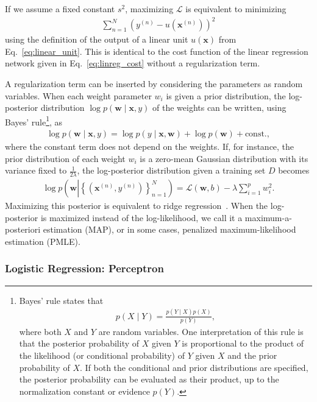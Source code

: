 \documentclass{now}
\newcommand{\vect}[1]{\mathbf{#1}}
\newcommand{\vx}[0]{\vect{x}}
\newcommand{\vw}[0]{\vect{w}}
\newcommand{\LL}[0]{\mathcal{L}}
\begin{document}
If we assume a fixed constant $s^2$, maximizing $\LL$ is equivalent to
minimizing
\begin{align*}
    \sum_{n=1}^N \left( y^{(n)} - u(\vx^{(n)})\right)^2
\end{align*}
using the definition of the output of a linear unit $u(\vx)$ from
Eq.~\eqref{eq:linear_unit}. This is identical to the cost function of the linear
regression network given in Eq.~\eqref{eq:linreg_cost} without a regularization
term. 

A regularization term can be inserted by considering the parameters as random
variables. When each weight parameter $w_i$ is given a prior distribution, the
log-posterior distribution $\log p(\vw \mid \vx, y)$ of the weights can be
written, using Bayes' rule\footnote{
    Bayes' rule states that
    \begin{align}
        \label{eq:bayes_rule}
        p(X \mid Y) = \frac{p(Y \mid X) p(X)}{p(Y)},
    \end{align}
    where both $X$ and $Y$ are random variables. One
    interpretation of this rule is that the posterior
    probability of $X$ given $Y$ is proportional to the product
    of the likelihood (or conditional probability) of $Y$ given
    $X$ and the prior probability of $X$. 
    If both the
    conditional and prior distributions are specified, the
    posterior probability can be evaluated as their product, up
    to the normalization constant or evidence $p(Y)$.
}, as
\begin{align*}
    \log p(\vw \mid \vx, y) = \log p(y \mid \vx, \vw) + \log
    p(\vw) + \text{const.},
\end{align*}
where the constant term does not depend on the weights. If, for instance, the
prior distribution of each weight $w_i$ is a zero-mean Gaussian distribution
with its variance fixed to $\tfrac{1}{2\lambda}$, the log-posterior distribution
given a training set $D$ becomes
\begin{align*}
    \log p\left(\vw \left| \left\{ (\vx^{(n)}, y^{(n)})
    \right\}_{n=1}^N \right. \right) = \LL(\vw, b) - \lambda
    \sum_{i=1}^p w_i^2.
\end{align*}
Maximizing this posterior is equivalent to ridge regression~\citep{Hoerl1970}.
When the log-posterior is maximized instead of the log-likelihood, we call it a
maximum-a-posteriori estimation (MAP), or in some cases, penalized maximum-likelihood estimation (PMLE).


\subsubsection{Logistic Regression: Perceptron}
\label{sec:log_reg}
\end{document}
